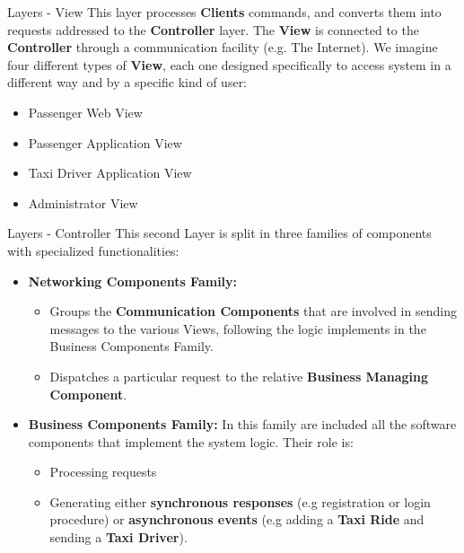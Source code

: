 \documentclass{../common/latex_classes/pdf_presentation}
\begin{document}
	\begin{frame}{Layers - View}
		This layer processes \textbf{Clients} commands, and converts them into requests addressed to the \textbf{Controller} layer.
		The \textbf{View} is connected to the \textbf{Controller} through a communication facility (e.g. The Internet).
		We imagine four different types of \textbf{View}, each one designed specifically to access \myTaxiService{} system in a different way and by a specific kind of user:
		\begin{itemize}
			\item Passenger Web View
			\item Passenger Application View
			\item Taxi Driver Application View
			\item Administrator View
		\end{itemize}
	\end{frame}
	
	\begin{frame}{Layers - Controller}
		This second Layer is split in three families of components with specialized functionalities:
		\begin{itemize}
			\item \textbf{Networking Components Family:}
			\begin{itemize}
				\item Groups the \textbf{Communication Components} that are involved in sending messages to the various Views, following the logic implements in the Business Components Family. 
				\item Dispatches a particular request to the relative \textbf{Business Managing Component}.
			\end{itemize}
			\item \textbf{Business Components Family:} In this family are included all the software components that implement the system logic.
			Their role is:
			\begin{itemize}
				\item Processing requests 
				\item Generating either \textbf{synchronous responses} (e.g registration or login procedure) or \textbf{asynchronous events} (e.g adding a \textbf{Taxi Ride} and sending a \textbf{Taxi Driver}).
			\end{itemize}
		\end{itemize}
	\end{frame}
	
\end{document}
